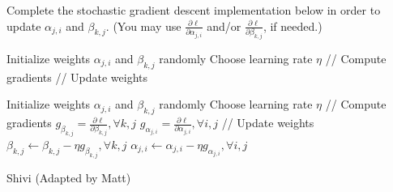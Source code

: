 \begin{parts}
\begin{subparts}
    
    
\subpart[3] Complete the stochastic gradient descent implementation below in order to update $\alpha_{j,i}$ and $\beta_{k,j}$. (You may use $\frac{\partial \ell}{\partial\alpha_{j,i}}$ and/or $\frac{\partial \ell}{\partial\beta_{k,j}}$, if needed.)

    \begin{tcolorbox}[height=7.5cm, width=15cm, blank, borderline={1pt}{-2pt},nobeforeafter]
    \begin{algorithmic}
    \State Initialize weights \(\alpha_{j,i}\) and \(\beta_{k,j}\) randomly
    \State Choose learning rate \(\eta\)
            \State // Compute gradients
            \State 
            \State 
            \State
            \State
            \State // Update weights
            \State 
            \State 
            \State
            \State
        \EndFor
    \EndFor
    \end{algorithmic}
    \end{tcolorbox}
    
    \begin{soln}
    \begin{algorithmic}
    \State Initialize weights \(\alpha_{j,i}\) and \(\beta_{k,j}\) randomly
    \State Choose learning rate \(\eta\)
            \State // Compute gradients
            \State $g_{\beta_{k,j}} = \frac{\partial \ell}{\partial\beta_{k,j}}, \forall k,j $
            \State $g_{\alpha_{j,i}} = \frac{\partial \ell}{\partial\alpha_{j,i}}, \forall i,j $
            \State // Update weights
            \State \(\beta_{k,j} \gets \beta_{k,j} - \eta  g_{\beta_{k,j}}, \forall k,j \)
            \State  \(\alpha_{j,i} \gets \alpha_{j,i} - \eta g_{\alpha_{j,i}}, \forall i,j \)
        \EndFor
    \EndFor
    \end{algorithmic}
    \end{soln}
    \begin{qauthor}   Shivi (Adapted by Matt)    \end{qauthor}
    

\end{subparts}
\end{parts}
